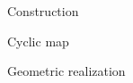 \documentclass[../../main.tex]{subfiles}
\begin{document}
    Construction
    
    Cyclic map
    
    Geometric realization
\end{document}
